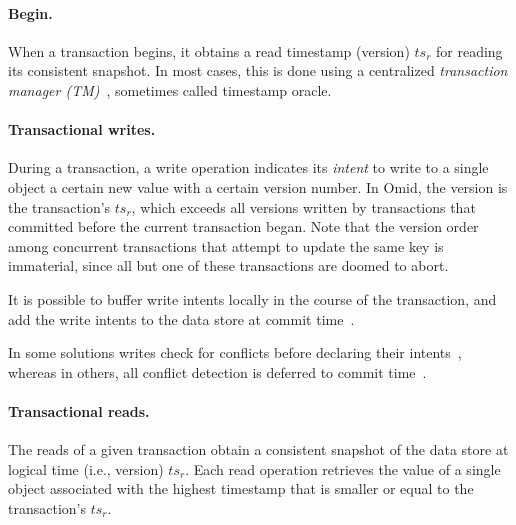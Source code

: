 \paragraph{Begin.} 
  When a transaction begins, it obtains a read timestamp (version) $ts_r$ for reading its consistent snapshot.
 In most cases, this is done using a centralized \emph{transaction manager (TM)}~\cite{Percolator2010,OmidICDE2014,Omid2017,tephra},
 sometimes called timestamp oracle. 

\paragraph{Transactional writes.} 
 During a transaction, a write operation indicates its \emph{intent} to write to a single object a certain new value with a certain version number.
In Omid, the version is the transaction's $ts_r$, which exceeds all versions written by transactions that committed before the
current transaction began. Note that the version order among concurrent transactions that  attempt to update the same key is immaterial, 
since all but one of these transactions are doomed to abort. 

It is possible to buffer write intents locally in the course of the transaction, and add the write intents to the data store at commit time~\cite{Percolator2010}.

In some solutions writes check for conflicts before declaring their intents~\cite{cockroach}, whereas in others, 
all conflict detection is deferred to commit time~\cite{Percolator2010,OmidICDE2014,Omid2017,tephra}. 

\paragraph{Transactional reads.} 
The reads of a given transaction obtain a consistent snapshot of the data store at logical time (i.e., version) $ts_r$.
Each read operation retrieves the value of a single object associated with the highest timestamp that is 
smaller or equal to the transaction's $ts_r$. 

